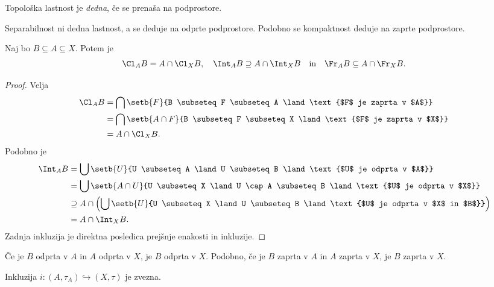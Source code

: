 \begin{definicija}
Topološka lastnost je
\emph{dedna}, če se
prenaša na podprostore.
\end{definicija}

\begin{opomba}
Separabilnost ni dedna lastnost, a se deduje na odprte podprostore.
Podobno se kompaktnost deduje na zaprte podprostore.
\end{opomba}


\begin{trditev}
Naj bo $B \subseteq A \subseteq X$. Potem je
\[
\Cl_A B = A \cap \Cl_X B, \quad
\Int_A B \supseteq A \cap \Int_X B
\quad \text{in} \quad
\Fr_A B \subseteq A \cap \Fr_X B.
\]
\end{trditev}

\begin{proof}
Velja
\begin{align*}
\Cl_A B &=
\bigcap\setb{F}
{B \subseteq F \subseteq A \land \text{$F$ je zaprta v $A$}}
\\
&= \bigcap\setb{A \cap F}
{B \subseteq F \subseteq X \land \text{$F$ je zaprta v $X$}}
\\
&= A \cap \Cl_X B.
\end{align*}
Podobno je
\begin{align*}
\Int_A B &=
\bigcup\setb{U}
{U \subseteq A \land U \subseteq B \land
\text{$U$ je odprta v $A$}}
\\
&= \bigcup\setb{A \cap U}
{U \subseteq X \land U \cap A \subseteq B \land
\text{$U$ je odprta v $X$}}
\\
&\supseteq A \cap \left(\bigcup\setb{U}
{U \subseteq X \land U \subseteq B \land
\text{$U$ je odprta v $X$ in $B$}}\right)
\\
&= A \cap \Int_X B.
\end{align*}
Zadnja inkluzija je direktna posledica prejšnje enakosti in
inkluzije.
\end{proof}

\begin{trditev}
Če je $B$ odprta v $A$ in $A$ odprta v $X$, je $B$ odprta v $X$.
Podobno, če je $B$ zaprta v $A$ in $A$ zaprta v $X$, je $B$ zaprta
v $X$.
\end{trditev}

\obvs

\begin{trditev}
Inkluzija $i \colon (A, \tau_A) \hookrightarrow (X, \tau)$ je
zvezna.
\end{trditev}

